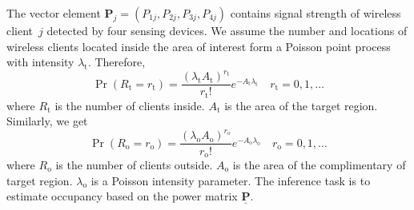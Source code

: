 The vector element $\mathbf{P}_j = (P_{1j}, P_{2j},P_{3j},P_{4j})$ contains signal strength of wireless client~$j$ detected by four sensing devices.
We assume the number and locations of wireless clients located inside the area of interest form a Poisson point process with intensity $\lambda_{\mathrm{t}}$.
Therefore,
\begin{equation*}
\Pr ( R_{\mathrm{t}} = r_{\mathrm{t}} )
= \frac{(\lambda_{\mathrm{t}} A_{\mathrm{t}})^{r_{\mathrm{t}}}}
{r_{\mathrm{t}}!} e^{- A_{\mathrm{t}} \lambda_{\mathrm{t}}}
\quad r_{\mathrm{t}} = 0, 1, \ldots
\end{equation*}
where $R_{\mathrm{t}}$ is the number of clients inside.
$A_{\mathrm{t}}$ is the area of the target region.
Similarly, we get
\begin{equation*}
\Pr ( R_{\mathrm{o}} = r_{\mathrm{o}} )
= \frac{(\lambda_{\mathrm{o}} A_{\mathrm{o}})^{r_{\mathrm{o}}}}
{r_{\mathrm{o}}!} e^{- A_{\mathrm{o}} \lambda_{\mathrm{o}}}
\quad r_{\mathrm{o}} = 0, 1, \ldots
\end{equation*}
where $R_{\mathrm{o}}$ is the number of clients outside.
$A_{\mathrm{o}}$ is the area of the complimentary of target region.
$\lambda_{\mathrm{o}}$ is a Poisson intensity parameter.
The inference task is to estimate occupancy based on the power matrix $\underline{\mathbf{P}}$.
